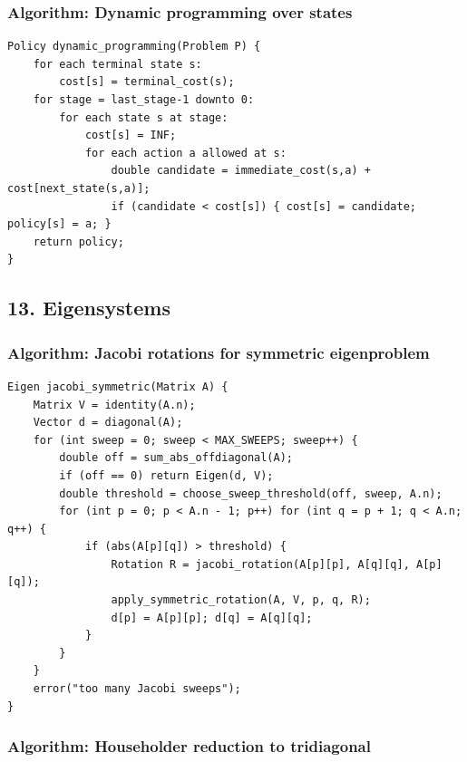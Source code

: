 \documentclass[11pt]{article}
\begin{document}
\subsubsection{Algorithm: Dynamic programming over states}\label{algorithm-dynamic-programming-over-states}

\begin{verbatim}
Policy dynamic_programming(Problem P) {
    for each terminal state s:
        cost[s] = terminal_cost(s);
    for stage = last_stage-1 downto 0:
        for each state s at stage:
            cost[s] = INF;
            for each action a allowed at s:
                double candidate = immediate_cost(s,a) + cost[next_state(s,a)];
                if (candidate < cost[s]) { cost[s] = candidate; policy[s] = a; }
    return policy;
}
\end{verbatim}

\subsection{13. Eigensystems}\label{eigensystems}

\subsubsection{Algorithm: Jacobi rotations for symmetric eigenproblem}\label{algorithm-jacobi-rotations-for-symmetric-eigenproblem}

\begin{verbatim}
Eigen jacobi_symmetric(Matrix A) {
    Matrix V = identity(A.n);
    Vector d = diagonal(A);
    for (int sweep = 0; sweep < MAX_SWEEPS; sweep++) {
        double off = sum_abs_offdiagonal(A);
        if (off == 0) return Eigen(d, V);
        double threshold = choose_sweep_threshold(off, sweep, A.n);
        for (int p = 0; p < A.n - 1; p++) for (int q = p + 1; q < A.n; q++) {
            if (abs(A[p][q]) > threshold) {
                Rotation R = jacobi_rotation(A[p][p], A[q][q], A[p][q]);
                apply_symmetric_rotation(A, V, p, q, R);
                d[p] = A[p][p]; d[q] = A[q][q];
            }
        }
    }
    error("too many Jacobi sweeps");
}
\end{verbatim}

\subsubsection{Algorithm: Householder reduction to tridiagonal}\label{algorithm-householder-reduction-to-tridiagonal}
\end{document}
